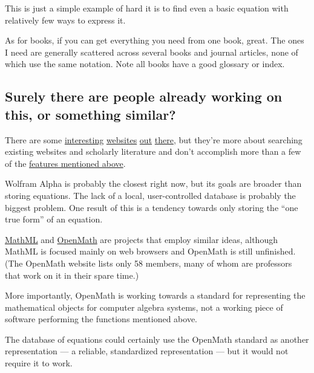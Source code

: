 \documentclass[12pt,letterpaper]{article}
\begin{document}

This is just a simple example of hard it is to find even a basic equation with relatively few ways to express it.


As for books, if you can get everything you need from one book, great.
The ones I need are generally scattered across several books and journal articles,
none of which use the same notation.
Note all books have a good glossary or index.

\subsection{Surely there are people already working on this, or something similar?}

There are some
\href{http://symbolab.com/}
{interesting}
\href{http://latexsearch.com/}
{websites}
\href{http://www.dessci.com/en/reference/searching/math-searching.htm}
{out}
\href{http://www.equationsheet.com/}
{there},
but they're more about searching existing websites and scholarly literature
and don't accomplish more than a few of the \hyperref[sec:features]{features mentioned above}.



Wolfram Alpha is probably the closest right now,
but its goals are broader than storing equations.
The lack of a local, user-controlled database is probably the biggest problem.
One result of this is a tendency towards only storing the ``one true form'' of an equation.

\href{http://www.w3.org/Math/}
{MathML}
and
\href{http://www.openmath.org/}
{OpenMath} are projects that employ similar ideas,
although MathML is focused mainly on web browsers and OpenMath is still unfinished.
(The OpenMath website lists only 58 members,
many of whom are professors that work on it in their spare time.)

More importantly,
OpenMath is working towards a standard for representing the mathematical objects for computer algebra systems,
not a working piece of software performing the functions mentioned above.

The database of equations could certainly use the OpenMath standard as another representation
--- a reliable, standardized representation ---
but it would not require it to work.
\end{document}
